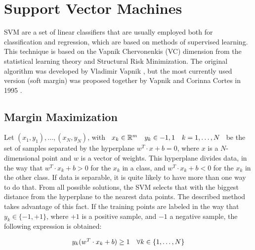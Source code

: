 
\graphicspath{{./images/chapter06/bmps/}{./images/chapter06/vects/}{./images/chapter06/}}

\chapter{Support Vector Machines}\label{ch:appendixSVM}

\acf{SVM} are a set of linear classifiers that are usually employed both for classification and regression, which are based on methods of supervised learning. This technique is based on the Vapnik Chervonenkis (VC) dimension from the statistical learning theory and Structural Risk Minimization.
The original algorithm was developed by Vladimir Vapnik \cite{vapnik1998statistical}, but the most currently used version (soft margin) was proposed together by Vapnik and Corinna Cortes in 1995 \cite{cortes1995support}.

\section{Margin Maximization}\label{ch:appendixSVM_01}

Let $(x_1,y_1),\dots,(x_N,y_N)$, with $\begin{array}{l c r}  
  x_k \in \mathbb{R}^m & y_k \in {-1,1} & k=1,\dots,N 
\end{array}$ be the set of samples separated by the hyperplane $w^T \cdot x + b = 0$, where $x$ is a $N$-dimensional point and $w$ is a vector of weights. This hyperplane divides data, in the way that $w^T \cdot x_k + b > 0$ for the $x_k$ in a class, and $w^T \cdot x_k + b < 0$ for the $x_k$ in the other class. If data is separable, it is quite likely to have more than one way to do that. From all possible solutions, the \ac{SVM} selects that with the biggest distance from the hyperplane to the nearest data points. The described method takes advantage of this fact.
If the training points are labeled in the way that $y_k \in \{ -1, +1\}$, where $+1$ is a positive sample, and $-1$ a negative sample, the following expression is obtained:

\begin{equation}\label{eq:appendixSVM_hyperplane_scaled}
  \begin{array}{l r}
    y_k (w^T \cdot x_k + b) \geq 1 & \forall k \in \{1, \dots, N \}
  \end{array}
\end{equation}

